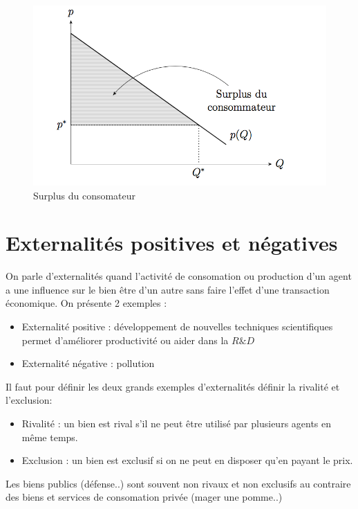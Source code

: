 \begin{figure}[h]
\begin{center}
\includegraphics[scale=0.7]{./img/IM1}
\caption{Surplus du consomateur}
\end{center}
\end{figure}



\section{Externalités positives et négatives} %
\label{sub:externalites_positives_et_negatives}

On parle d'externalités quand l'activité de consomation ou production d'un agent a une influence sur le bien être d'un autre sans faire l'effet d'une transaction économique. On présente 2 exemples :
\begin{itemize}
	\item Externalité positive : développement de nouvelles techniques scientifiques permet d'améliorer productivité ou aider dans la $R\&D$
	\item Externalité négative : pollution
\end{itemize}

Il faut pour définir les deux grands exemples d'externalités définir la rivalité et l'exclusion: 
\begin{itemize}
	\item Rivalité : un bien est rival s'il ne peut être utilisé par plusieurs agents en même temps.
	\item Exclusion : un bien est exclusif si on ne peut en disposer qu'en payant le prix.
\end{itemize}
Les biens publics (défense..) sont souvent non rivaux et non exclusifs au contraire des biens et services de consomation privée (mager une pomme..)

